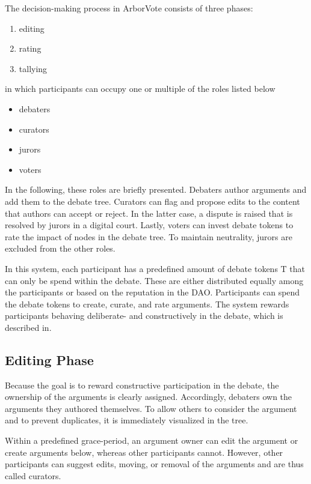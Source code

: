 \documentclass[%
aip,
amsmath,amssymb,
reprint,%
unsortedaddress,
nofootinbib
]{revtex4-2}
\newcommand{\T}{\text{T}}
\begin{document}
The decision-making process in ArborVote consists of three phases:
\begin{enumerate}[noitemsep]
	\item editing
	\item rating
	\item tallying
\end{enumerate}
in which participants can occupy one or multiple of the roles listed below
\begin{itemize}[noitemsep]
	\item debaters
	\item curators
	\item jurors
	\item voters
\end{itemize}
In the following, these roles are briefly presented.
Debaters author arguments and add them to the debate tree.
Curators can flag and propose edits to the content that authors can accept or reject.
In the latter case, a dispute is raised that is resolved by jurors in a digital court.
Lastly, voters can invest debate tokens to rate the impact of nodes in the debate tree.
To maintain neutrality, jurors are excluded from the other roles.

In this system, 
each participant has a predefined amount of debate tokens $\T$ that can only be spend within the debate.
These are either distributed equally among the participants or based on the reputation in the \ac{DAO}.
%
Participants can spend the debate tokens 
to create, curate, and rate arguments.
%
The system rewards participants behaving deliberate- and constructively in the debate, 
which is described in.

\subsection{Editing Phase}\label{sec:EditingPhase}
Because the goal is to reward constructive participation in the debate, 
the ownership of the arguments is clearly assigned.
Accordingly, debaters own the arguments they authored themselves.
To allow others to consider the argument and to prevent duplicates, it is immediately visualized in the tree.

Within a predefined grace-period, an argument owner can edit the argument or create arguments below, 
whereas other participants cannot.
However, other participants can suggest edits, moving, or removal of the arguments and are thus called curators.
\end{document}

